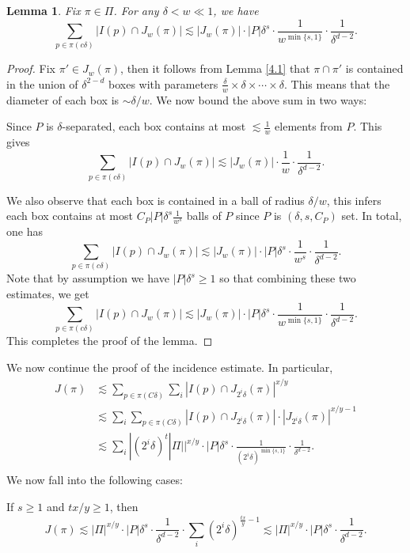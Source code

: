 \documentclass[11pt]{article}
\newtheorem{lemma}[theorem]{Lemma}
\newcommand{\1}{\mathbf{1}}
\begin{document}
\begin{lemma}\label{4.2}
    Fix $\pi\in \Pi$. For any $\delta<w\ll 1$, we have
    \[\sum_{p\in \pi(c\delta)}|I(p)\cap J_{w}(\pi)|\lesssim |J_{w}(\pi)|\cdot |P|\delta^{s} \cdot \frac{1}{w^{\min\{s, 1\}}}\cdot \frac{1}{\delta^{d-2}}.\]
\end{lemma}
\begin{proof}
    Fix $\pi'\in J_{w}(\pi)$, then it follows from Lemma \ref{4.1} that $\pi\cap \pi'$ is contained in the union of $\delta^{2-d}$ boxes with parameters $\frac{\delta}{w}\times \delta\times \cdots\times \delta$. This means that the diameter of each box is $\sim \delta/w$. We now bound the above sum in two ways:


    Since $P$ is $\delta$-separated, each box contains at most $\lesssim \frac{1}{w}$ elements from $P$. This gives
    \[\sum_{p\in \pi(c\delta)}|I(p)\cap J_{w}(\pi)|\lesssim |J_{w}(\pi)|\cdot \frac{1}{w}\cdot \frac{1}{\delta^{d-2}}.\]

    We also observe that each box is contained in a ball of radius $\delta/w$, this infers each box contains at most $C_P |P|\delta^{s}\frac{1}{w^s}$ balls of $P$ since $P$ is $(\delta, s, C_P)$ set. In total, one has
    \[\sum_{p\in \pi(c\delta)}|I(p)\cap J_{w}(\pi)|\lesssim |J_{w}(\pi)|\cdot |P|\delta^{s} \cdot \frac{1}{w^s}\cdot \frac{1}{\delta^{d-2}}.\]
    Note that by assumption we have $|P|\delta^{s} \geq 1$ so that combining these two estimates, we get
    \[\sum_{p\in \pi(c\delta)}|I(p)\cap J_{w}(\pi)|\lesssim |J_{w}(\pi)|\cdot |P|\delta^{s}\cdot  \frac{1}{w^{\min\{s, 1\}}}\cdot \frac{1}{\delta^{d-2}}.\]
    This completes the proof of the lemma.
\end{proof}
We now continue the proof of the incidence estimate. In particular,
\begin{align*}
    J(\pi) & \lesssim \sum_{p\in \pi(C\delta)}\sum_{i}|I(p)\cap J_{2^i\delta}(\pi)|^{x/y}                                                             \\
           & \lesssim  \sum_{i}\sum_{p\in \pi(C\delta)}|I(p)\cap J_{2^i\delta}(\pi)|\cdot |J_{2^i\delta}(\pi)|^{x/y-1}                                \\
           & \lesssim \sum_{i}|(2^i \delta)^t|\Pi||^{x/y }\cdot |P|\delta^{s} \cdot \frac{1}{(2^i\delta)^{\min\{s, 1\}}}\cdot \frac{1}{\delta^{d-2}}. \\
\end{align*}
We now fall into the following cases:

If $s\ge 1$ and $tx/y\ge 1$, then
\[J(\pi)\lesssim |\Pi|^{x/y} \cdot |P|\delta^{s} \cdot \frac{1}{\delta^{d-2}}\cdot \sum_{i}(2^i\delta)^{\frac{tx}{y}-1}\lesssim |\Pi|^{x/y} \cdot |P|\delta^{s} \cdot \frac{1}{\delta^{d-2}}.\]
\end{document}
